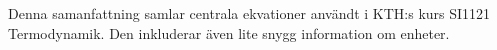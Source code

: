 Denna samanfattning samlar centrala ekvationer användt i KTH:s kurs SI1121 Termodynamik. Den inkluderar även lite snygg information om enheter.